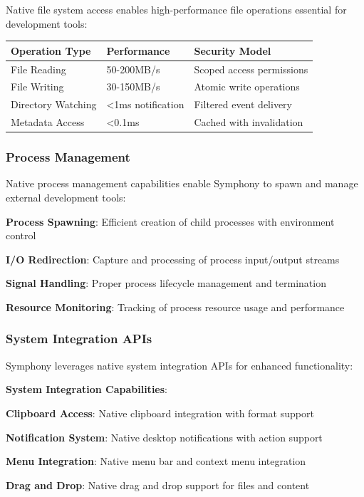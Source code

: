 Native file system access enables high-performance file operations essential for development tools:

\begin{center}
\begin{tabular}{@{}lll@{}}
\toprule
\textbf{Operation Type} & \textbf{Performance} & \textbf{Security Model} \\
\midrule
File Reading & 50-200MB/s & Scoped access permissions \\
File Writing & 30-150MB/s & Atomic write operations \\
Directory Watching & <1ms notification & Filtered event delivery \\
Metadata Access & <0.1ms & Cached with invalidation \\
\bottomrule
\end{tabular}
\end{center}

\subsubsection*{Process Management}

Native process management capabilities enable Symphony to spawn and manage external development tools:

\begin{expandedlist}
    \item \textbf{Process Spawning}: Efficient creation of child processes with environment control
    \item \textbf{I/O Redirection}: Capture and processing of process input/output streams
    \item \textbf{Signal Handling}: Proper process lifecycle management and termination
    \item \textbf{Resource Monitoring}: Tracking of process resource usage and performance
\end{expandedlist}

\subsubsection*{System Integration APIs}

Symphony leverages native system integration APIs for enhanced functionality:

\begin{successbox}
\textbf{System Integration Capabilities}:
\begin{compactlist}
    \item \textbf{Clipboard Access}: Native clipboard integration with format support
    \item \textbf{Notification System}: Native desktop notifications with action support
    \item \textbf{Menu Integration}: Native menu bar and context menu integration
    \item \textbf{Drag and Drop}: Native drag and drop support for files and content
\end{compactlist}
\end{successbox}


